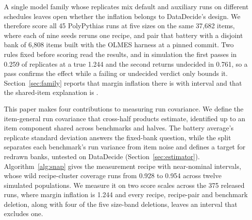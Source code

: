A single model family whose replicates mix default and auxiliary runs on different schedules leaves open whether the inflation belongs to DataDecide's design. We therefore score all 45 PolyPythias runs at five sizes on the same 37,682 items, where each of nine seeds reruns one recipe, and pair that battery with a disjoint bank of 6,808 items built with the OLMES harness \citep{gu2025olmes} at a pinned commit. Two rules fixed before scoring read the results, and in simulation the first passes in 0.259 of replicates at a true 1.244 and the second returns undecided in 0.761, so a pass confirms the effect while a failing or undecided verdict only bounds it. Section~\ref{sec:family} reports that margin inflation there is  with interval  and that the shared-item explanation is .

This paper makes four contributions to measuring run covariance. We define the item-general run covariance that cross-half products estimate, identified up to an item component shared across benchmarks and halves. The battery average's replicate standard deviation answers the fixed-bank question, while the split separates each benchmark's run variance from item noise and defines a target for redrawn banks, untested on DataDecide (Section~\ref{sec:estimator}). Algorithm~\ref{alg:snap} gives the measurement recipe with near-nominal intervals, whose wild recipe-cluster coverage runs from 0.928 to 0.954 across twelve simulated populations. We measure it on two score scales across the 375 released runs, where margin inflation is 1.244 and every recipe, recipe-pair and benchmark deletion, along with four of the five size-band deletions, leaves an interval that excludes one.
